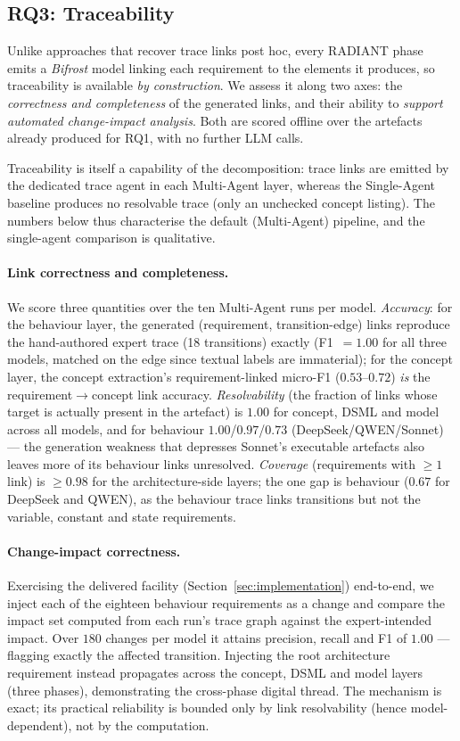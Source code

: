 \subsection{RQ3: Traceability}
\label{sec:eval:trace}
Unlike approaches that recover trace links post hoc, every RADIANT phase emits a \textit{Bifrost} model linking each requirement to the elements it produces, so traceability is available \emph{by construction}.
We assess it along two axes: the \emph{correctness and completeness} of the generated links, and their ability to \emph{support automated change-impact analysis}.
Both are scored offline over the artefacts already produced for RQ1, with no further LLM calls.

Traceability is itself a capability of the decomposition: trace links are emitted by the dedicated trace agent in each Multi-Agent layer, whereas the Single-Agent baseline produces no resolvable trace (only an unchecked concept listing).
The numbers below thus characterise the default (Multi-Agent) pipeline, and the single-agent comparison is qualitative.

\paragraph{Link correctness and completeness.} We score three quantities over the ten Multi-Agent runs per model.
\emph{Accuracy}: for the behaviour layer, the generated (requirement, transition-edge) links reproduce the hand-authored expert trace (18 transitions) exactly (F1~$=1.00$ for all three models, matched on the edge since textual labels are immaterial); for the concept layer, the concept extraction's requirement-linked micro-F1 ($0.53$--$0.72$) \emph{is} the requirement$\rightarrow$concept link accuracy.
\emph{Resolvability} (the fraction of links whose target is actually present in the artefact) is $1.00$ for concept, DSML and model across all models, and for behaviour $1.00$/$0.97$/$0.73$ (DeepSeek/QWEN/Sonnet) --- the generation weakness that depresses Sonnet's executable artefacts also leaves more of its behaviour links unresolved.
\emph{Coverage} (requirements with $\geq 1$ link) is $\geq 0.98$ for the architecture-side layers; the one gap is behaviour ($0.67$ for DeepSeek and QWEN), as the behaviour trace links transitions but not the variable, constant and state requirements.

\paragraph{Change-impact correctness.} Exercising the delivered facility (Section~\ref{sec:implementation}) end-to-end, we inject each of the eighteen behaviour requirements as a change and compare the impact set computed from each run's trace graph against the expert-intended impact.
Over $180$ changes per model it attains precision, recall and F1 of $1.00$ --- flagging exactly the affected transition.
Injecting the root architecture requirement instead propagates across the concept, DSML and model layers (three phases), demonstrating the cross-phase digital thread.
The mechanism is exact; its practical reliability is bounded only by link resolvability (hence model-dependent), not by the computation.

